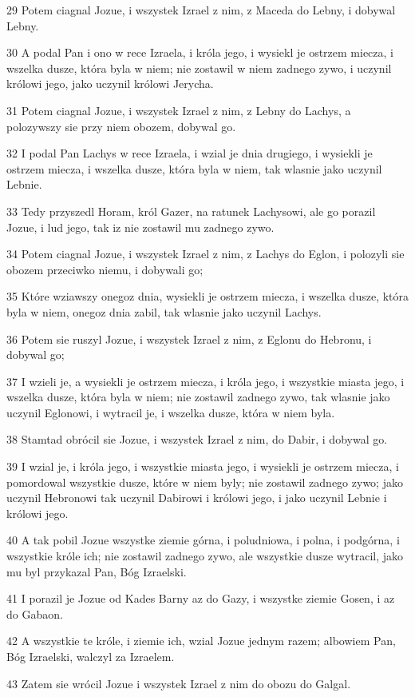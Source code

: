\par 29 Potem ciagnal Jozue, i wszystek Izrael z nim, z Maceda do Lebny, i dobywal Lebny.
\par 30 A podal Pan i ono w rece Izraela, i króla jego, i wysiekl je ostrzem miecza, i wszelka dusze, która byla w niem; nie zostawil w niem zadnego zywo, i uczynil królowi jego, jako uczynil królowi Jerycha.
\par 31 Potem ciagnal Jozue, i wszystek Izrael z nim, z Lebny do Lachys, a polozywszy sie przy niem obozem, dobywal go.
\par 32 I podal Pan Lachys w rece Izraela, i wzial je dnia drugiego, i wysiekli je ostrzem miecza, i wszelka dusze, która byla w niem, tak wlasnie jako uczynil Lebnie.
\par 33 Tedy przyszedl Horam, król Gazer, na ratunek Lachysowi, ale go porazil Jozue, i lud jego, tak iz nie zostawil mu zadnego zywo.
\par 34 Potem ciagnal Jozue, i wszystek Izrael z nim, z Lachys do Eglon, i polozyli sie obozem przeciwko niemu, i dobywali go;
\par 35 Które wziawszy onegoz dnia, wysiekli je ostrzem miecza, i wszelka dusze, która byla w niem, onegoz dnia zabil, tak wlasnie jako uczynil Lachys.
\par 36 Potem sie ruszyl Jozue, i wszystek Izrael z nim, z Eglonu do Hebronu, i dobywal go;
\par 37 I wzieli je, a wysiekli je ostrzem miecza, i króla jego, i wszystkie miasta jego, i wszelka dusze, która byla w niem; nie zostawil zadnego zywo, tak wlasnie jako uczynil Eglonowi, i wytracil je, i wszelka dusze, która w niem byla.
\par 38 Stamtad obrócil sie Jozue, i wszystek Izrael z nim, do Dabir, i dobywal go.
\par 39 I wzial je, i króla jego, i wszystkie miasta jego, i wysiekli je ostrzem miecza, i pomordowal wszystkie dusze, które w niem byly; nie zostawil zadnego zywo; jako uczynil Hebronowi tak uczynil Dabirowi i królowi jego, i jako uczynil Lebnie i królowi jego.
\par 40 A tak pobil Jozue wszystke ziemie górna, i poludniowa, i polna, i podgórna, i wszystkie króle ich; nie zostawil zadnego zywo, ale wszystkie dusze wytracil, jako mu byl przykazal Pan, Bóg Izraelski.
\par 41 I porazil je Jozue od Kades Barny az do Gazy, i wszystke ziemie Gosen, i az do Gabaon.
\par 42 A wszystkie te króle, i ziemie ich, wzial Jozue jednym razem; albowiem Pan, Bóg Izraelski, walczyl za Izraelem.
\par 43 Zatem sie wrócil Jozue i wszystek Izrael z nim do obozu do Galgal.

